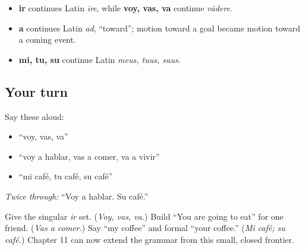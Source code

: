 \begin{cousinweb}
\begin{itemize}
\raggedright
  \item \textbf{ir} continues Latin \emph{īre}, while \textbf{voy, vas, va} continue \emph{vādere}.
  \item \textbf{a} continues Latin \emph{ad}, “toward”; motion toward a goal became motion toward a coming event.
  \item \textbf{mi, tu, su} continue Latin \emph{meus, tuus, suus}.
\end{itemize}
\end{cousinweb}

\subsection*{Your turn}
Say these aloud:

\begin{itemize}
\raggedright
  \item “voy, vas, va”
  \item “voy a hablar, vas a comer, va a vivir”
  \item “mi café, tu café, su café”
\end{itemize}

\emph{Twice through:} “Voy a hablar. Su café.”

\begin{tcolorbox}[breakable,colback=teal!4,colframe=teal!35!black,title={Before you move on}]
Give the singular \emph{ir} set. (\emph{Voy, vas, va.}) Build “You are going to eat” for one friend. (\emph{Vas a comer.}) Say “my coffee” and formal “your coffee.” (\emph{Mi café; su café.}) Chapter 11 can now extend the grammar from this small, closed frontier.
\end{tcolorbox}
